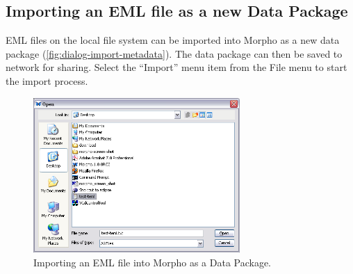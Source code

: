 \subsection{Importing an EML file as a new Data Package}
\label{sec:importing}

EML files on the local file system can be imported into Morpho as a new
data package (\autoref{fig:dialog-import-metadata}). The data package
can then be saved to network for sharing. Select the “Import” menu item
from the File menu to start the import process.

\begin{figure}
  \centering
    \includegraphics[width=0.7\textwidth]{images/dialog-import-metadata.png}
  \caption{Importing an EML file into Morpho as a Data Package.}
  \label{fig:dialog-import-metadata}
\end{figure}

